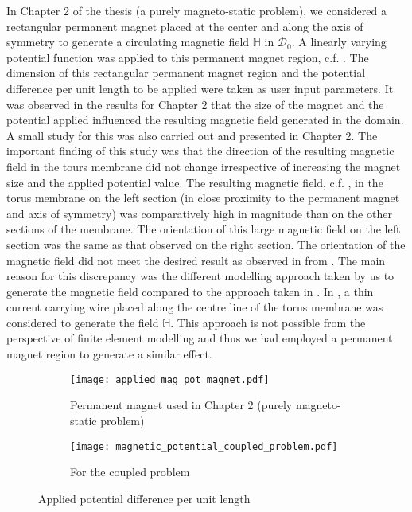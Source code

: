In Chapter 2 of the thesis (a purely magneto-static problem), we considered a rectangular permanent magnet placed at the center and along the axis of symmetry to generate a circulating magnetic field $\mathbb{H}$ in $\mathcal{D}_0$. A linearly varying potential function was applied to this permanent magnet region, c.f. . The dimension of this rectangular permanent magnet region and the potential difference per unit length to be applied were taken as user input parameters. It was observed in the results for Chapter 2 that the size of the magnet and the potential applied influenced the resulting magnetic field generated in the domain. A small study for this was also carried out and presented in Chapter 2. The important finding of this study was that the direction of the resulting magnetic field in the tours membrane did not change irrespective of increasing the magnet size and the applied potential value. The resulting magnetic field, c.f. , in the torus membrane on the left section (in close proximity to the permanent magnet and axis of symmetry) was comparatively high in magnitude than on the other sections of the membrane. The orientation of this large magnetic field on the left section was the same as that observed on the right section. The orientation of the magnetic field did not meet the desired result as observed in  from \cite{reddy_toroid}. The main reason for this discrepancy was the different modelling approach taken by us to generate the magnetic field compared to the approach taken in \cite{reddy_toroid}. In \cite{reddy_toroid}, a thin current carrying wire placed along the centre line of the torus membrane was considered to generate the field $\mathbb{H}$. This approach is not possible from the perspective of finite element modelling and thus we had employed a permanent magnet region to generate a similar effect. \par 

\begin{figure}[h]
\centering
\begin{subfigure}{0.35\textwidth}
\centering
\texttt{[image: applied\_mag\_pot\_magnet.pdf]}
\caption{Permanent magnet used in Chapter 2 (purely magneto-static problem)}
\label{fig:3.4.1}
\end{subfigure}
\begin{subfigure}{0.5\textwidth}
\centering
\texttt{[image: magnetic\_potential\_coupled\_problem.pdf]}
\caption{For the coupled problem}
\label{fig:3.4.2}
\end{subfigure}
\caption{Applied potential difference per unit length}
\label{fig:3.4}
\end{figure}


